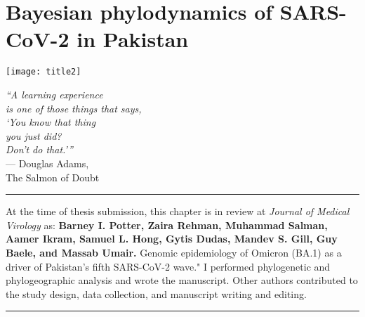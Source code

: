 \chapter{Bayesian phylodynamics of SARS-CoV-2 in Pakistan}\label{ch:chapter2}

\begin{minipage}[b]{0.6\textwidth}
    \texttt{[image: title2]} %
  \end{minipage}
  \hfill
  \begin{minipage}[b]{0.32\textwidth}
    \footnotesize
    \begin{flushright}
      \textit{``A learning experience\\is one of those things that says,\\`You know that thing\\you just did?\\Don't do that.'\thinspace''} \\
      --- Douglas Adams, \\The Salmon of Doubt
    \end{flushright}
    \vspace{2cm}
\end{minipage}
  
\clearpage

\singlespacing

\hrule
\vspace*{12pt}
At the time of thesis submission, this chapter is in review at \textit{Journal of Medical Virology} as: \textbf{Barney I. Potter, Zaira Rehman, Muhammad Salman, Aamer Ikram, Samuel L. Hong, Gytis Dudas, Mandev S. Gill, Guy Baele, and Massab Umair.} Genomic epidemiology of Omicron (BA.1) as a driver of Pakistan's fifth SARS-CoV-2 wave."
I performed phylogenetic and phylogeographic analysis and wrote the manuscript.
Other authors contributed to the study design, data collection, and manuscript writing and editing.
\vspace*{12pt}
\hrule

\onehalfspacing

